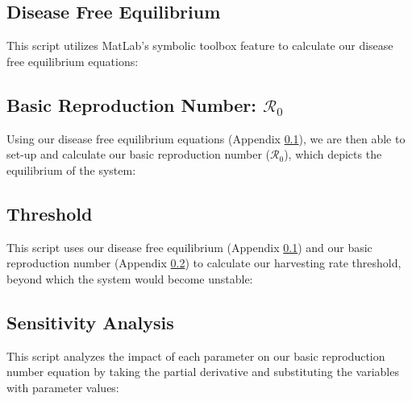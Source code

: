 \documentclass[12pt]{article}
\begin{document}
        \subsection{Disease Free Equilibrium}
        \label{appendix:B3}
        This script utilizes MatLab's symbolic toolbox feature to calculate our disease free equilibrium equations:
        \begin{center}
            
        \end{center}
        
        \subsection{Basic Reproduction Number: $\mathscr{R}_0$}
        \label{appendix:B4}
        Using our disease free equilibrium equations (Appendix \ref{appendix:B3}), we are then able to set-up and calculate our basic reproduction number ($\mathscr{R}_0$), which depicts the equilibrium of the system:
        \begin{center}
            
        \end{center}
        
        \subsection{Threshold}
        \label{appendix:B5}
        This script uses our disease free equilibrium (Appendix \ref{appendix:B3}) and our basic reproduction number (Appendix \ref{appendix:B4}) to calculate our harvesting rate threshold, beyond which the system would become unstable:
        \begin{center}
            
        \end{center}
        
        \subsection{Sensitivity Analysis}
        This script analyzes the impact of each parameter on our basic reproduction number equation by taking the partial derivative and substituting the variables with parameter values:
        \label{appendix:B6}
        \begin{center}
            
        \end{center}
        
\end{document}
